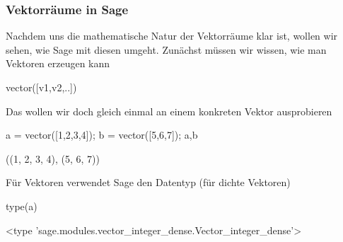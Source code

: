 \documentclass[fontsize=12pt,paper=a4,twoside,bibtotoc,idxtotoc,
liststotoc,pagesize,BCOR1.2cm,DIV15,chapterprefix,pagesize=pdftex]{scrbook}
\theoremstyle{plain}
\theoremstyle{definition}
\theoremstyle{remark}
\begin{document}
\subsubsection{Vektorräume in Sage}
Nachdem uns die mathematische Natur der Vektorräume klar ist, wollen wir sehen, wie Sage mit diesen umgeht. Zunächst müssen wir wissen, wie man Vektoren erzeugen kann
\begin{sagein}
vector([v1,v2,..]) 
\end{sagein}
Das wollen wir doch gleich einmal an einem konkreten Vektor ausprobieren
\begin{sagein}
a = vector([1,2,3,4]); b = vector([5,6,7]); a,b
\end{sagein}
\begin{sage}
((1, 2, 3, 4), (5, 6, 7))
\end{sage}
Für Vektoren verwendet Sage den Datentyp  (für dichte Vektoren)
\begin{sagein}
type(a)
\end{sagein}
\begin{sage}
<type 'sage.modules.vector_integer_dense.Vector_integer_dense'>
\end{sage}
\end{document}
